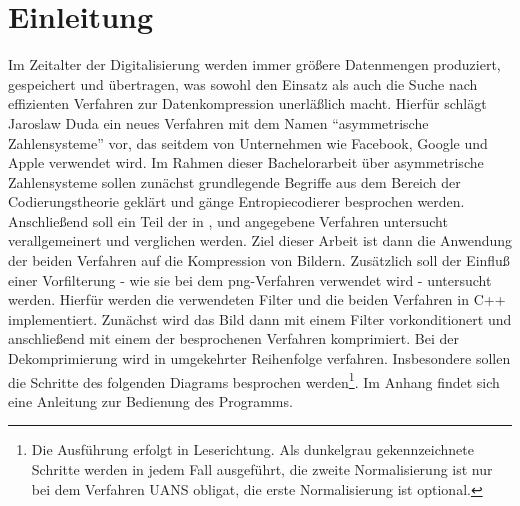 \documentclass[a4paper,12pt]{article}
\begin{document}
\section{Einleitung}
Im Zeitalter der Digitalisierung werden immer größere Datenmengen produziert, gespeichert und übertragen, was sowohl den Einsatz als auch die Suche nach effizienten Verfahren zur Datenkompression unerläßlich macht.
Hierfür schlägt Jaroslaw Duda\cite{Duda} ein neues Verfahren mit dem Namen "`asymmetrische Zahlensysteme"' vor, das seitdem von Unternehmen wie Facebook\cite{fb}, Google\cite{google} und Apple\cite{apple} verwendet wird. 
Im Rahmen dieser Bachelorarbeit über asymmetrische Zahlensysteme sollen zunächst grundlegende Begriffe aus dem Bereich der Codierungstheorie geklärt und gänge Entropiecodierer besprochen werden.
Anschließend soll ein Teil der  in \cite{Giesen}, \cite{Duda} und \cite{Krajcevski} angegebene Verfahren untersucht verallgemeinert und verglichen werden.
Ziel dieser Arbeit ist dann die Anwendung der beiden Verfahren auf die Kompression von Bildern. Zusätzlich soll der Einfluß einer Vorfilterung  - wie sie bei dem png-Verfahren verwendet wird - untersucht werden. Hierfür werden die verwendeten Filter und die beiden Verfahren in C++ implementiert. Zunächst wird das Bild dann mit einem Filter vorkonditionert und anschließend mit einem der besprochenen Verfahren komprimiert. Bei der Dekomprimierung wird in umgekehrter Reihenfolge verfahren. Insbesondere sollen die Schritte des folgenden Diagrams besprochen werden\footnote{Die Ausführung erfolgt in Leserichtung. Als dunkelgrau gekennzeichnete Schritte werden in jedem Fall ausgeführt, die zweite Normalisierung ist nur bei dem Verfahren UANS obligat, die erste Normalisierung ist optional.}. Im Anhang findet sich eine Anleitung zur Bedienung des Programms.


\begin{flushleft}
\end{flushleft}
\end{document}
